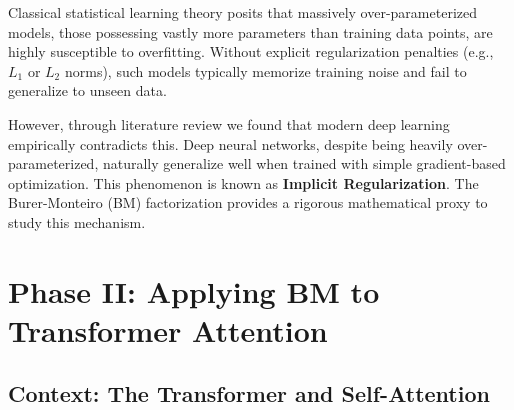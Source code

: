 

Classical statistical learning theory posits that massively over-parameterized models, those possessing vastly more parameters than training data points, are highly susceptible to overfitting. Without explicit regularization penalties (e.g., $L_1$ or $L_2$ norms), such models typically memorize training noise and fail to generalize to unseen data.

However, through literature review we found that modern deep learning empirically contradicts this. Deep neural networks, despite being heavily over-parameterized, naturally generalize well when trained with simple gradient-based optimization. This phenomenon is known as \textbf{Implicit Regularization}. The Burer-Monteiro (BM) factorization provides a rigorous mathematical proxy to study this mechanism.




\section{Phase II: Applying BM to Transformer Attention}
\label{sec:attention_bm}

\subsection{Context: The Transformer and Self-Attention}

